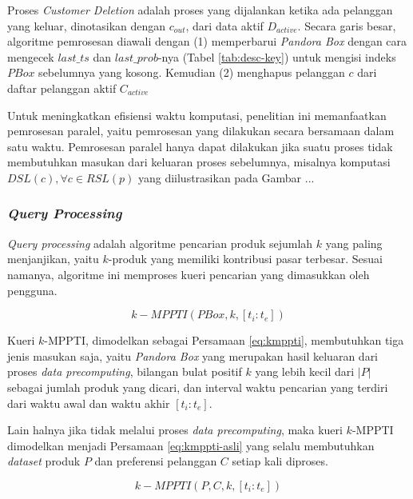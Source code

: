 
Proses \textit{Customer Deletion} adalah proses yang dijalankan ketika ada pelanggan yang keluar, dinotasikan dengan $c_{out}$, dari data aktif $D_{active}$. Secara garis besar, algoritme pemrosesan diawali dengan (1) memperbarui \textit{Pandora Box} dengan cara mengecek $last\_ts$ dan $last\_prob$-nya (Tabel \ref{tab:desc-key}) untuk mengisi indeks $PBox$ sebelumnya yang kosong. Kemudian (2) menghapus pelanggan $c$ dari daftar pelanggan aktif $C_{active}$


Untuk meningkatkan efisiensi waktu komputasi, penelitian ini memanfaatkan pemrosesan paralel, yaitu pemrosesan yang dilakukan secara bersamaan dalam satu waktu. Pemrosesan paralel hanya dapat dilakukan jika suatu proses tidak membutuhkan masukan dari keluaran proses sebelumnya, misalnya komputasi $DSL(c), \forall c \in RSL(p)$ yang diilustrasikan pada Gambar ...

\subsubsection{\textit{Query Processing}}
\tab \textit{Query processing} adalah algoritme pencarian produk sejumlah $k$ yang paling menjanjikan, yaitu $k$-produk yang memiliki kontribusi pasar terbesar. Sesuai namanya, algoritme ini memproses kueri pencarian yang dimasukkan oleh pengguna.

\begin{equation}\label{eq:kmppti}
k-MPPTI(PBox, k, [t_i:t_e])
\end{equation} 

Kueri $k$-MPPTI, dimodelkan sebagai Persamaan \ref{eq:kmppti}, membutuhkan tiga jenis masukan saja, yaitu \textit{Pandora Box} yang merupakan hasil keluaran dari proses \textit{data precomputing}, bilangan bulat positif $k$ yang lebih kecil dari $|P|$ sebagai jumlah produk yang dicari, dan interval waktu pencarian yang terdiri dari waktu awal dan waktu akhir $[t_i:t_e]$. 

Lain halnya jika tidak melalui proses \textit{data precomputing}, maka kueri $k$-MPPTI dimodelkan menjadi Persamaan \ref{eq:kmppti-asli} yang selalu membutuhkan \textit{dataset} produk $P$ dan preferensi pelanggan $C$ setiap kali diproses.  

\begin{equation}\label{eq:kmppti-asli}
k-MPPTI(P, C, k, [t_i:t_e])
\end{equation} 

